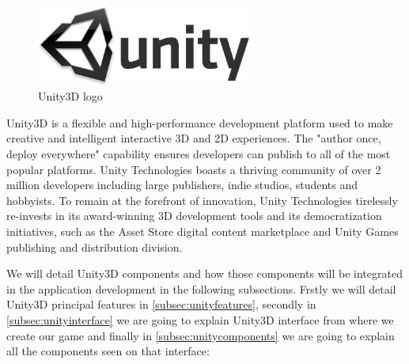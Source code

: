 \begin{figure}[h]
\centering
\includegraphics[width=200pt]{graphics/enabling-tech/unity_logo.png}
\caption{Unity3D logo}
\label{fig:unity_logo}
\end{figure}

Unity3D is a flexible and high-performance development platform used to make creative and intelligent interactive 3D and 2D experiences. The "author once, deploy everywhere" capability ensures developers can publish to all of the most popular platforms. Unity Technologies boasts a thriving community of over 2 million developers including large publishers, indie studios, students and hobbyists. To remain at the forefront of innovation, Unity Technologies tirelessly re-invests in its award-winning 3D development tools and its democratization initiatives, such as the Asset Store digital content marketplace and Unity Games publishing and distribution division.~\cite{unitypress1}

We will detail Unity3D components and how those components will be integrated in the application development in the following subsections. Frstly we will detail Unity3D principal features in \ref{subsec:unityfeatures}, secondly in \ref{subsec:unityinterface} we are going to explain Unity3D interface from where we create our game and finally in \ref{subsec:unitycomponents} we are going to explain all the components seen on that interface:

